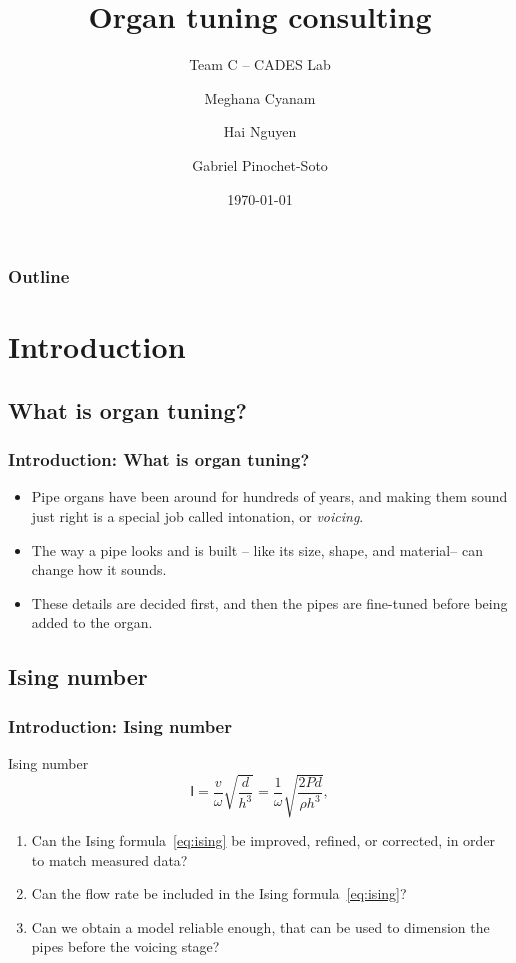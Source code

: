 \documentclass{beamer}
\title{Organ tuning consulting}
\subtitle{Team C -- CADES Lab}
\author[Cyanam, Nguyen, Pinochet-Soto]{Meghana Cyanam \and Hai Nguyen \and Gabriel Pinochet-Soto}
\institute{Portland State University}
\date{\today}
\begin{document}
    {
    \begin{frame}
		\titlepage
	\end{frame}
    }

    \begin{frame}
        \frametitle{Outline}
        \tableofcontents
    \end{frame}

    \section{Introduction}
    \subsection{What is organ tuning?}
	\begin{frame}
        \frametitle{Introduction: What is organ tuning?}
		\begin{itemize}
            \item<1->
                Pipe organs have been around for hundreds of years, and making them sound just
                right is a special job called intonation, or \emph{voicing}.

			\item<2->
                The way a pipe looks and is built -- like its size, shape, and material-- can
                change how it sounds.

			\item<3->
                These details are decided first, and then the pipes are fine-tuned before being
                added to the organ.
		\end{itemize}
	\end{frame}

    \subsection{Ising number}
    \begin{frame}
        \frametitle{Introduction: Ising number}
        \begin{alertblock}{Ising number}
            \begin{equation}
                \label{eq:ising}
                \mathsf{I}
                =
                \frac{v}{\omega}\sqrt{\frac{d}{h^3}}
                =
                \frac{1}{\omega}\sqrt{\frac{2 P d}{\rho h^3}},
            \end{equation}
        \end{alertblock}
        \begin{enumerate}
            \item Can the Ising formula~\ref{eq:ising} be improved, refined, or
                corrected, in order to match measured data?
            \item Can the flow rate be included in the Ising formula~\ref{eq:ising}?
            \item Can we obtain a model reliable enough, that can be used to dimension the
                pipes before the voicing stage?
        \end{enumerate}
    \end{frame}
\end{document}
